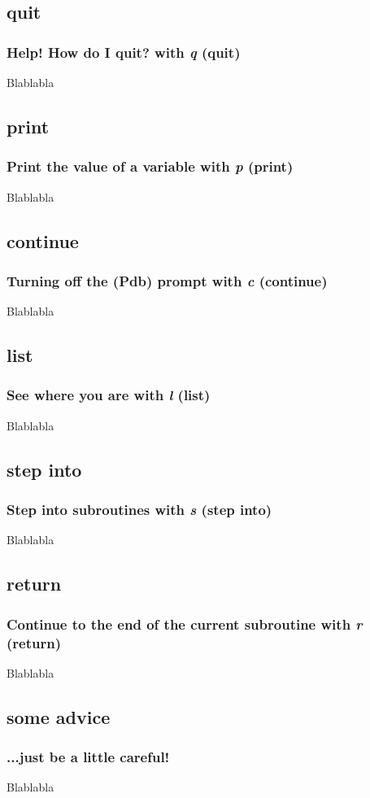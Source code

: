 \subsection{quit}
\begin{frame}
\frametitle{Help! How do I quit? with \textit{\textbf{q}} (quit)}
Blablabla
\end{frame}

\subsection{print}
\begin{frame}
\frametitle{Print the value of a variable with \textit{\textbf{p}} (print)}
Blablabla
\end{frame}

\subsection{continue}
\begin{frame}
\frametitle{Turning off the (Pdb) prompt with \textit{\textbf{c}} (continue)}
Blablabla
\end{frame}

\subsection{list}
\begin{frame}
\frametitle{See where you are with \textit{\textbf{l}} (list)}
Blablabla
\end{frame}

\subsection{step into}
\begin{frame}
\frametitle{Step into subroutines with \textit{\textbf{s}} (step into)}
Blablabla
\end{frame}

\subsection{return}
\begin{frame}
\frametitle{Continue to the end of the current subroutine with \textit{\textbf{r}} (return)}
Blablabla
\end{frame}

\subsection{some advice}
\begin{frame}
\frametitle{...just be a little careful!}
Blablabla
\end{frame}






